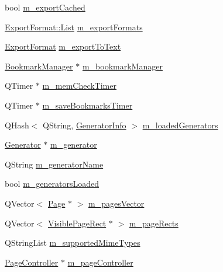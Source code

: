 \begin{DoxyCompactItemize}
\item 
bool \hyperlink{classOkular_1_1DocumentPrivate_ad738776539c25a2b18b0d482c406b424}{m\+\_\+export\+Cached}
\item 
\hyperlink{classOkular_1_1ExportFormat_a987d72c1a1456b8a983a37603a8fa78d}{Export\+Format\+::\+List} \hyperlink{classOkular_1_1DocumentPrivate_a674e49f7a287a70630bc5550b1a44169}{m\+\_\+export\+Formats}
\item 
\hyperlink{classOkular_1_1ExportFormat}{Export\+Format} \hyperlink{classOkular_1_1DocumentPrivate_a6c71a54787a3a6d6c16f79e2eb77ebbd}{m\+\_\+export\+To\+Text}
\item 
\hyperlink{classOkular_1_1BookmarkManager}{Bookmark\+Manager} $\ast$ \hyperlink{classOkular_1_1DocumentPrivate_a098282fb7e82c81ea9402333864fd389}{m\+\_\+bookmark\+Manager}
\item 
Q\+Timer $\ast$ \hyperlink{classOkular_1_1DocumentPrivate_aa403a95dfe9f344c12c7409319aaf62f}{m\+\_\+mem\+Check\+Timer}
\item 
Q\+Timer $\ast$ \hyperlink{classOkular_1_1DocumentPrivate_a1d64b1924e24e32715cc5c7b3471595f}{m\+\_\+save\+Bookmarks\+Timer}
\item 
Q\+Hash$<$ Q\+String, \hyperlink{structGeneratorInfo}{Generator\+Info} $>$ \hyperlink{classOkular_1_1DocumentPrivate_a449d3ae52e95d649dba62225f20a4195}{m\+\_\+loaded\+Generators}
\item 
\hyperlink{classOkular_1_1Generator}{Generator} $\ast$ \hyperlink{classOkular_1_1DocumentPrivate_a52083f79ce95756ddea060e74315e91f}{m\+\_\+generator}
\item 
Q\+String \hyperlink{classOkular_1_1DocumentPrivate_a4f02c151d836f43f47a6eeb614b25bf0}{m\+\_\+generator\+Name}
\item 
bool \hyperlink{classOkular_1_1DocumentPrivate_a443010c7211e13e1589b1124a9147dd0}{m\+\_\+generators\+Loaded}
\item 
Q\+Vector$<$ \hyperlink{classOkular_1_1Page}{Page} $\ast$ $>$ \hyperlink{classOkular_1_1DocumentPrivate_a73b852d9a73ffe8061b66dbf9b290f17}{m\+\_\+pages\+Vector}
\item 
Q\+Vector$<$ \hyperlink{classOkular_1_1VisiblePageRect}{Visible\+Page\+Rect} $\ast$ $>$ \hyperlink{classOkular_1_1DocumentPrivate_a2d167614d4dc602ada64ab925cee6dce}{m\+\_\+page\+Rects}
\item 
Q\+String\+List \hyperlink{classOkular_1_1DocumentPrivate_a4150d34c787b214e91672cd197df9835}{m\+\_\+supported\+Mime\+Types}
\item 
\hyperlink{classOkular_1_1PageController}{Page\+Controller} $\ast$ \hyperlink{classOkular_1_1DocumentPrivate_a0764e01a78ed52ece9229f50300522f1}{m\+\_\+page\+Controller}

\end{DoxyCompactItemize}
